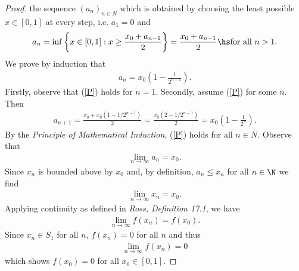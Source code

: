 \documentclass{article}
\begin{document}
\begin{proof}
    the sequence $(a_n)_{n\in N}$ which is obtained by choosing the least possible
    $x\in[0,1]$ at every step, i.e. $a_1=0$ and
    \begin{align*}
        a_n = \inf\left\lbrace x\in [0,1] : x \geq \frac{x_0+a_{n-1}}{2}\right\rbrace = \frac{x_0+a_{n-1}}{2}
        \hs\text{for all }n>1.
    \end{align*}
    We prove by induction that
    \begin{align}
        \label{P}
        a_n = x_0 \left(1-\frac{1}{2^{n-1}}\right).
    \end{align}
    Firstly, observe that (\ref{P}) holds for $n=1$. Secondly, assume (\ref{P}) for
    some $n$. Then
    \begin{align*}
        a_{n+1} = \frac{x_0 + x_0(1-1/2^{n-1})}{2}
        = \frac{x_0(2-1/2^{n-1})}{2} = x_0\left(1-\frac{1}{2^n}\right).
    \end{align*}
    By the \emph{Principle of Mathematical Induction}, (\ref{P}) holds for all $n\in N$.
    Observe that
    \begin{align*}
        \lim_{n\to\infty}a_n = x_0.
    \end{align*}
    Since $x_n$ is bounded above by $x_0$ and, by definition, $a_n\leq x_n$ for all $n\in\N$
    we find
    \begin{align*}
        \lim_{n\to\infty}x_n = x_0.
    \end{align*}
    Applying continuity as defined in \emph{Ross, Definition 17.1}, we have
    \begin{align*}
        \lim_{n\to\infty} f(x_n) = f(x_0).
    \end{align*}
    Since $x_n\in S_1$ for all $n$, $f(x_n)=0$ for all $n$ and thus
    \begin{align*}
        \lim_{n\to\infty} f(x_n) = 0
    \end{align*}
    which shows $f(x_0)=0$ for all $x_0\in[0,1]$.
\end{proof}
\end{document}
